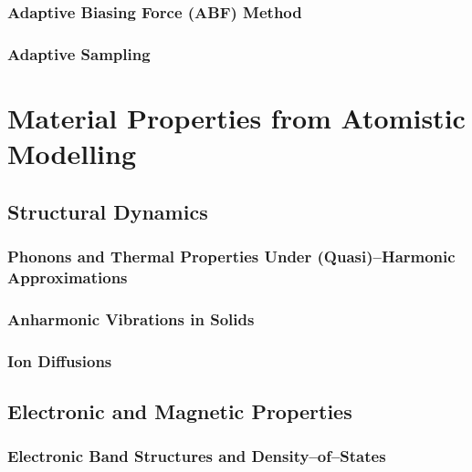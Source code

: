 \documentclass[%
aip,
rmp,
10pt, 
amsmath,
amssymb,
floatfix,
nofootinbib,
]{revtex4-2}
\begin{document}
\subsubsection{Adaptive Biasing Force (ABF) Method}

\subsubsection{Adaptive Sampling}



\section{Material Properties from Atomistic Modelling}\label{chapter:physical_properties}

\subsection{Structural Dynamics}\label{sect:phonon_harmonic_and_anharmonic}

\subsubsection{Phonons and Thermal Properties Under (Quasi)--Harmonic Approximations}\label{sect:phonon}


\subsubsection{Anharmonic Vibrations in Solids}\label{sec:anharmonic_vibs}



\subsubsection{Ion Diffusions}


\subsection{Electronic and Magnetic Properties}

\subsubsection{Electronic Band Structures and Density--of--States}\label{sect:band_structure}

\end{document}
